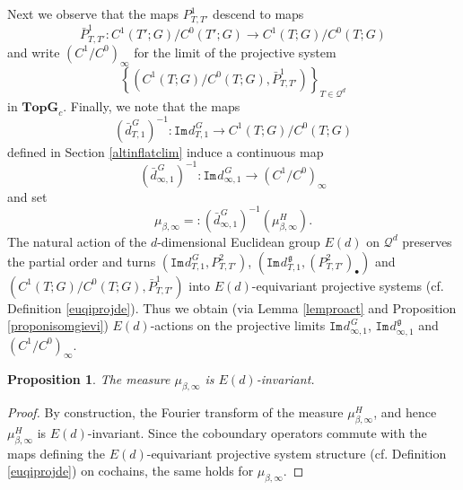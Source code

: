 \documentclass[11pt,reqno]{amsart}
\numberwithin{equation}{section}
\newtheorem{proposition}[theorem]{Proposition}
\theoremstyle{remark}
\theoremstyle{rmdefinition}
\begin{document}
Next we observe that the maps $ P^1_{T,T'}$ descend to maps
$$  \bar{P}^1_{T,T'}: C^1(T';G)/C^0(T';G)  \to  C^1(T;G)/C^0(T;G) $$
and write $(C^1/C^0)_{\infty}$ for the limit of the 
projective system 
$$\left\{(C^1(T;G)/C^0(T;G),\bar{P}^1_{T,T'})\right\}_{T \in \mathcal{Q}^d}$$ in $\mathbf{TopG}_c$. Finally, we note that the maps
$$(\bar{d}^{\hspace{1pt}G}_{T,1})^{-1}: \mathtt{Im}\hspace{1pt}d_{T,1}^{\hspace{1pt}G}
 \to C^1(T;G)/C^0(T;G) $$
defined in Section \ref{altinflatclim} induce a continuous map
$$(\bar{d}^{\hspace{1pt}G}_{\infty,1})^{-1}: \mathtt{Im}\hspace{1pt}d_{\infty,1}^{\hspace{1pt}G} \to (C^1/C^0)_{\infty}$$
and set
$$\mu_{\beta, \infty}=: (\bar{d}^{\hspace{1pt}G}_{\infty,1})^{-1}(\mu^{H}_{\beta,\infty}).$$
The natural action of the $d$-dimensional Euclidean group $E(d)$ on $\mathcal{Q}^d$ preserves the partial order and turns
$(\mathtt{Im}\hspace{1pt}d_{T,1}^{\hspace{1pt}G},
P^2_{T,T'})$,
 $(\mathtt{Im}\hspace{1pt}d_{T,1}^{\hspace{1pt}\mathfrak g},
(P^2_{T,T'})_{\bullet})$ and $(C^1(T;G)/C^0(T;G),\bar{P}^1_{T,T'})$
into $E(d)$-equivariant projective systems (cf. Definition \ref{euqiprojde}). Thus we obtain (via Lemma \ref{lemproact} and Proposition \ref{proponisomgievi}) $E(d)$-actions on the projective limits
$\mathtt{Im}\hspace{1pt}d_{\infty,1}^{\hspace{1pt}G}$,
$\mathtt{Im}\hspace{1pt}d_{\infty,1}^{\hspace{1pt}\mathfrak g}$ and $(C^1/C^0)_{\infty}$.
\begin{proposition}
The measure $\mu_{\beta, \infty}$ is $E(d)$-invariant.
\end{proposition}
\begin{proof}
By construction, the Fourier transform of the measure $\mu^{H}_{\beta,\infty}$, and hence $\mu^{H}_{\beta,\infty}$  is $E(d)$-invariant. Since the coboundary operators commute with the maps defining the $E(d)$-equivariant projective system structure (cf. Definition \ref{euqiprojde}) on cochains, the same holds for $\mu_{\beta, \infty}$.
\end{proof}
\end{document}
